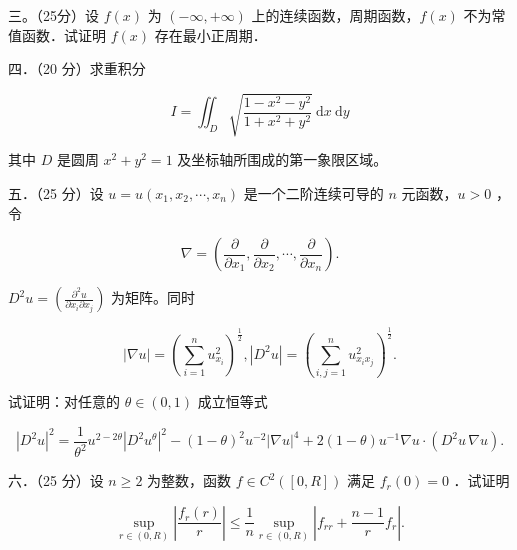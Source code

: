 \documentclass{article}
\begin{document}
三。（25分）设 \(f(x)\) 为 \((-\infty,+\infty)\) 上的连续函数，周期函数，\(f(x)\) 不为常值函数．试证明 \(f(x)\) 存在最小正周期．

四．（20 分）求重积分

\[
I=\iint_{D} \sqrt{\frac{1-x^{2}-y^{2}}{1+x^{2}+y^{2}}} \mathrm{~d} x \mathrm{~d} y
\]

其中 \(D\) 是圆周 \(x^{2}+y^{2}=1\) 及坐标轴所围成的第一象限区域。

五．（25 分）设 \(u=u\left(x_{1}, x_{2}, \cdots, x_{n}\right)\) 是一个二阶连续可导的 \(n\) 元函数，\(u>0\) ，令

\[
\nabla=\left(\frac{\partial}{\partial x_{1}}, \frac{\partial}{\partial x_{2}}, \cdots, \frac{\partial}{\partial x_{n}}\right) .
\]

\(D^{2} u=\left(\frac{\partial^{2} u}{\partial x_{i} \partial x_{j}}\right)\) 为矩阵。同时

\[
|\nabla u|=\left(\sum_{i=1}^{n} u_{x_{i}}^{2}\right)^{\frac{1}{2}},\left|D^{2} u\right|=\left(\sum_{i, j=1}^{n} u_{x_{i} x_{j}}^{2}\right)^{\frac{1}{2}} .
\]

试证明：对任意的 \(\theta \in(0,1)\) 成立恒等式

\[
\left|D^{2} u\right|^{2}=\frac{1}{\theta^{2}} u^{2-2 \theta}\left|D^{2} u^{\theta}\right|^{2}-(1-\theta)^{2} u^{-2}|\nabla u|^{4}+2(1-\theta) u^{-1} \nabla u\cdot\left(D^{2}u\,\nabla u\right) .
\]

六．（25 分）设 \(n \geq 2\) 为整数，函数 \(f \in C^{2}([0, R])\) 满足 \(f_{r}(0)=0\) ．试证明

\[
\sup _{r \in(0, R)}\left|\frac{f_{r}(r)}{r}\right| \leq \frac{1}{n} \sup _{r \in(0, R)}\left|f_{r r}+\frac{n-1}{r} f_{r}\right| .
\]
\end{document}
